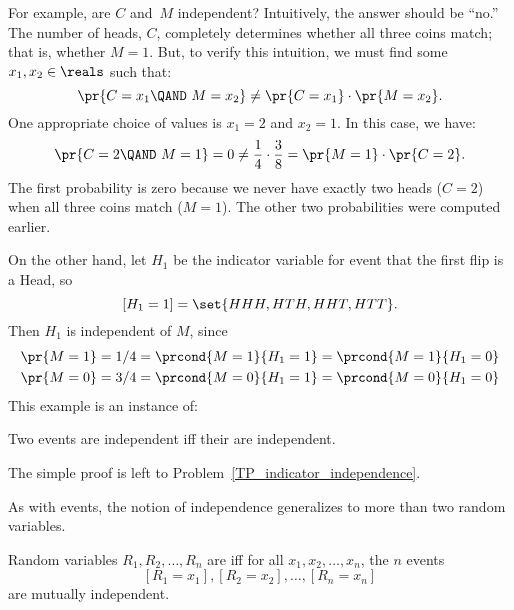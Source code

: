 For example, are $C$ and~$M$ independent?  Intuitively, the answer
should be ``no.''  The number of heads, $C$, completely determines
whether all three coins match; that is, whether $M = 1$.  But, to
verify this intuition, we must find some $x_1, x_2 \in \reals$ such
that:
\[
\pr{C = x_1 \QAND\ M = x_2} \neq \pr{C = x_1} \cdot \pr{M = x_2}.
\]
One appropriate choice of values is $x_1 = 2$ and $x_2 = 1$.
In this case, we have:
\[
\pr{C = 2 \QAND\ M = 1} = 0 \neq \dfrac{1}{4} \cdot \dfrac{3}{8} = \pr{M
= 1} \cdot \pr{C = 2}.
\]
The first probability is zero because we never have exactly two heads ($C
= 2$) when all three coins match ($M = 1$).  The other two probabilities
were computed earlier.

On the other hand, let $H_1$ be the indicator variable for event that the
first flip is a Head, so
\[
[H_1 = 1] = \set{HHH, HTH, HHT, HTT}.
\]
Then $H_1$ is independent of $M$, since
\begin{align*}
\pr{M=1} & = 1/4 = \prcond{M=1}{H_1=1} = \prcond{M=1}{H_1=0}\\
\pr{M=0} & = 3/4 = \prcond{M=0}{H_1=1} = \prcond{M=0}{H_1=0}
\end{align*}
This example is an instance of:
\begin{lemma}
  Two events are independent iff their  are
  independent.
\end{lemma}
The simple proof is left to Problem~\ref{TP_indicator_independence}.

As with events, the notion of independence generalizes to more than two
random variables.
\begin{definition}
Random variables $R_1, R_2, \dots, R_n$ are  iff
for all $x_1, x_2, \dots, x_n$, the $n$ events
\[
[R_1 = x_1], [R_2 = x_2], \dots, [R_n = x_n]
\] 
are mutually independent.

\iffalse

\begin{eqnarray*}
\lefteqn{\pr{R_1 = x_1 \QAND\ R_2 = x_2 \QAND \cdots \QAND\ R_n = x_n}}\\
        & = & \pr{R_1 = x_1} \cdot \pr{R_2 = x_2} \cdots \pr{R_n = x_n}.
\end{eqnarray*}
for all $x_1, x_2, \dots, x_n$.
\fi

\end{definition}

\iffalse
It is a simple exercise to show that the probability that any
\emph{subset} of the variables takes a particular set of values is equal
to the product of the probabilities that the individual variables take
their values.  Thus, for example, if $R_1, R_2, \dots, R_{100}$ are
mutually independent random variables, then it follows that:
\begin{align*}
\lefteqn{\pr{R_1 = 7 \QAND\ R_7 = 9.1 \QAND\ R_{23} = \pi}}\\
 & = \pr{R_1 = 7} \cdot \pr{R_7 = 9.1} \cdot \pr{R_{23} = \pi}.
\end{align*}
\fi

